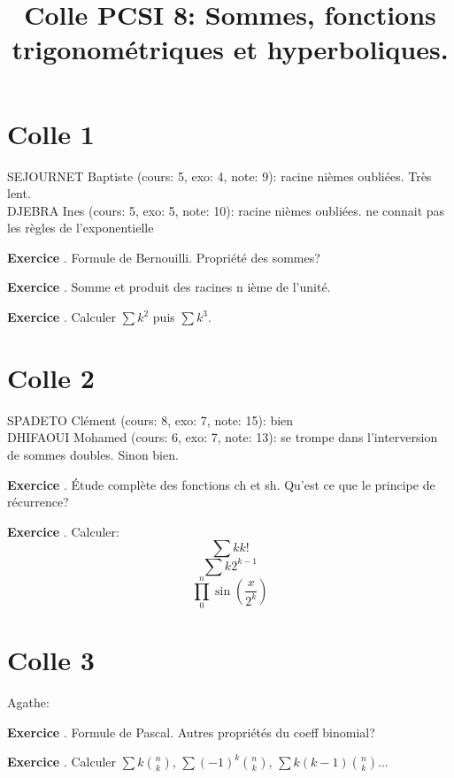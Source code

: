 \documentclass[10pt,a4paper]{article}
\title{Colle PCSI 8: Sommes, fonctions trigonométriques et hyperboliques.}
\newcounter{question}
\newcounter{exo}
\newenvironment{exo}{\vspace{0.5cm}\setcounter{question}{0}\addtocounter{exo}{1} \noindent \textbf{Exercice \theexo}. \normalsize }{\par}
\begin{document}
	\maketitle
	
	\section*{Colle 1}
	\setcounter{exo}{0}
	SEJOURNET Baptiste (cours: 5, exo: 4, note: 9): racine nièmes oubliées. Très lent.\\
	DJEBRA Ines (cours: 5, exo: 5, note: 10): racine nièmes oubliées. ne connait pas les règles de l'exponentielle
	
	\begin{exo}
		Formule de Bernouilli. Propriété des sommes?
	\end{exo}
	
	\begin{exo}
		Somme et produit des racines n ième de l'unité. 
	\end{exo}

	\begin{exo}
		Calculer $\sum k^2$ puis $\sum k^3$.
	\end{exo}	
	
	\section*{Colle 2}
	\setcounter{exo}{0}
	SPADETO Clément (cours: 8, exo: 7, note: 15): bien\\
	DHIFAOUI Mohamed (cours: 6, exo: 7, note: 13): se trompe dans l'interversion de sommes doubles. Sinon bien.
	
	\begin{exo}
		Étude complète des fonctions ch et sh. Qu'est ce que le principe de récurrence?
	\end{exo}
	
	\begin{exo}
		Calculer:
		$$\sum k k!$$ $$\sum k 2^{k-1}$$ $$\prod_{0}^{n} \sin(\frac{x}{2^k})$$
	\end{exo}
	
	\section*{Colle 3}
	\setcounter{exo}{0}
	Agathe:
	
	\begin{exo}
		Formule de Pascal. Autres propriétés du coeff binomial?
	\end{exo}
	\begin{exo}
		Calculer $\sum k \binom{n}{k}$, $\sum (-1)^k\binom{n}{k}$, $\sum k(k-1) \binom{n}{k}$...
	\end{exo}
	
\end{document}
